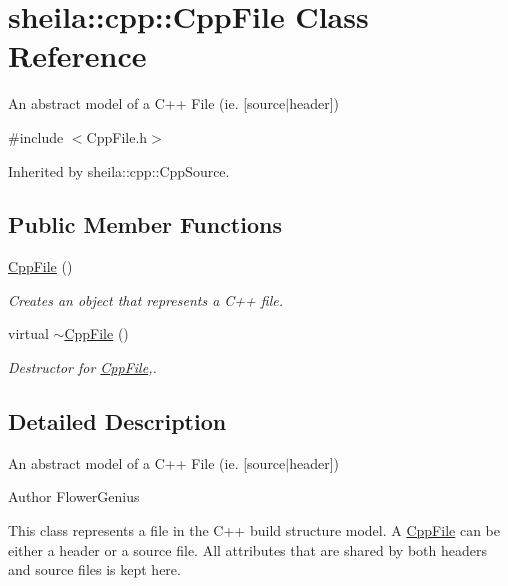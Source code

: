 \hypertarget{classsheila_1_1cpp_1_1CppFile}{}\section{sheila\+:\+:cpp\+:\+:Cpp\+File Class Reference}
\label{classsheila_1_1cpp_1_1CppFile}


An abstract model of a C++ File (ie. \mbox{[}source$\vert$header\mbox{]})  




{\ttfamily \#include $<$Cpp\+File.\+h$>$}



Inherited by sheila\+::cpp\+::\+Cpp\+Source.

\subsection*{Public Member Functions}
\begin{DoxyCompactItemize}
\item 
\hyperlink{classsheila_1_1cpp_1_1CppFile_acdb060cb462b4d11541904002c5acb3b}{Cpp\+File} ()
\begin{DoxyCompactList}\small\item\em Creates an object that represents a C++ file. \end{DoxyCompactList}\item 
virtual \hyperlink{classsheila_1_1cpp_1_1CppFile_a31a5b2b4eb53b18fc34c3506b9ba7671}{$\sim$\+Cpp\+File} ()
\begin{DoxyCompactList}\small\item\em Destructor for \hyperlink{classsheila_1_1cpp_1_1CppFile}{Cpp\+File},. \end{DoxyCompactList}\end{DoxyCompactItemize}


\subsection{Detailed Description}
An abstract model of a C++ File (ie. \mbox{[}source$\vert$header\mbox{]}) 

\begin{DoxyAuthor}{Author}
Flower\+Genius
\end{DoxyAuthor}
This class represents a file in the C++ build structure model. A \hyperlink{classsheila_1_1cpp_1_1CppFile}{Cpp\+File} can be either a header or a source file. All attributes that are shared by both headers and source files is kept here. 

